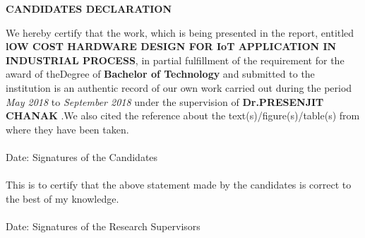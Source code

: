 \newpage
\begin{center}
{\large \bf CANDIDATES DECLARATION}
\end{center}
We hereby certify that the work, which is being presented in the report, entitled {\bf lOW COST HARDWARE DESIGN FOR IoT APPLICATION IN INDUSTRIAL PROCESS}, in partial fulfillment of the requirement for the award of theDegree of {\bf Bachelor of Technology} and submitted to the institution is an authentic record of our own work carried out
during the period \emph{May 2018} to \emph{September 2018} under the supervision of {\bf Dr.PRESENJIT CHANAK} .We also cited the reference about the text(s)/figure(s)/table(s) from where they have been taken.\\
\vspace{0.6in} \\
Date: \hspace{3.4in} Signatures of the Candidates \\
\vspace{0.2in} \\
This is to certify that the above statement made by the candidates is correct to the best of my knowledge. \\
\vspace{0.5in} \\
Date: \hspace{2.65in} Signatures of the Research Supervisors \\

